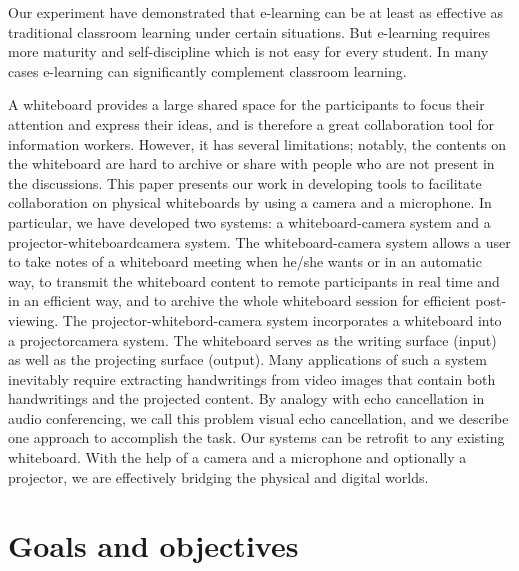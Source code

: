 Our experiment have demonstrated that e-learning can be at least as effective as traditional classroom learning under certain situations. But e-learning requires more maturity and self-discipline which is not easy for every student. In many cases e-learning can significantly complement classroom learning.

A whiteboard provides a large shared space for the participants to focus their attention and express their ideas, and is therefore a great collaboration tool for information workers. However, it has several limitations; notably, the contents on the whiteboard are hard to archive or share with people who are not present in the discussions. This paper presents our work in developing tools to facilitate collaboration on physical whiteboards by using a camera and a microphone. In particular, we have developed two systems: a whiteboard-camera system and a projector-whiteboardcamera system. The whiteboard-camera system allows a user to take notes of a whiteboard meeting when he/she wants or in an automatic way, to transmit the whiteboard content to remote participants in real time and in an efficient way, and to archive the whole whiteboard session for efficient post-viewing. The projector-whitebord-camera system incorporates a whiteboard into a projectorcamera system. The whiteboard serves as the writing surface (input) as well as the projecting surface (output). Many applications of such a system inevitably require extracting handwritings from video images that contain both handwritings and the projected content. By analogy with echo cancellation in audio conferencing, we call this problem visual echo cancellation, and we describe one approach to accomplish the task. Our systems can be retrofit to any existing whiteboard. With the help of a camera and a microphone and optionally a projector, we are effectively bridging the physical and digital worlds.


\section{Goals and objectives}

